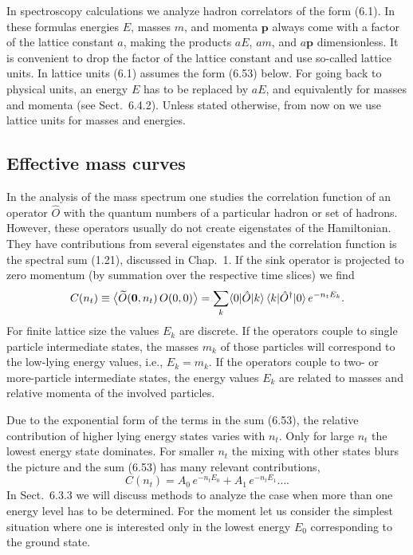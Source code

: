 In spectroscopy calculations we analyze hadron correlators of the form (6.1).
In these formulas energies $E$, masses $m$, and momenta $\mathbf{p}$ always
come with a factor of the lattice constant $a$, making the products $aE$,
$am$, and $a\mathbf{p}$ dimensionless. It is convenient to drop the factor of
the lattice constant and use so-called lattice units. In lattice units (6.1)
assumes the form (6.53) below. For going back to physical units, an energy $E$
has to be replaced by $aE$, and equivalently for masses and momenta (see
Sect.~6.4.2). Unless stated otherwise, from now on we use lattice units for
masses and energies.

\subsection{Effective mass curves}

In the analysis of the mass spectrum one studies the correlation function of an
operator $\hat{O}$ with the quantum numbers of a particular hadron or set of
hadrons. However, these operators usually do not create eigenstates of the
Hamiltonian. They have contributions from several eigenstates and the
correlation function is the spectral sum (1.21), discussed in Chap.~1. If the
sink operator is projected to zero momentum (by summation over the respective
time slices) we find
\begin{equation}
  C(n_t) \equiv \big\langle \widetilde{O}(\mathbf{0}, n_t)\, O(0, 0)
    \big\rangle = \sum_k \langle0|\hat{O}|k\rangle\,\langle k|\hat{O}^\dagger|0\rangle\,
    e^{-n_t E_k} .
\end{equation}
For finite lattice size the values $E_k$ are discrete. If the operators couple
to single particle intermediate states, the masses $m_k$ of those particles
will correspond to the low-lying energy values, i.e., $E_k = m_k$. If the
operators couple to two- or more-particle intermediate states, the energy
values $E_k$ are related to masses and relative momenta of the involved
particles.

Due to the exponential form of the terms in the sum (6.53), the relative
contribution of higher lying energy states varies with $n_t$. Only for large
$n_t$ the lowest energy state dominates. For smaller $n_t$ the mixing with
other states blurs the picture and the sum (6.53) has many relevant
contributions,
\begin{equation}
  C(n_t) = A_0\, e^{-n_t E_0} + A_1\, e^{-n_t E_1} \ldots .
\end{equation}
In Sect.~6.3.3 we will discuss methods to analyze the case when more than one
energy level has to be determined. For the moment let us consider the simplest
situation where one is interested only in the lowest energy $E_0$ corresponding
to the ground state.

